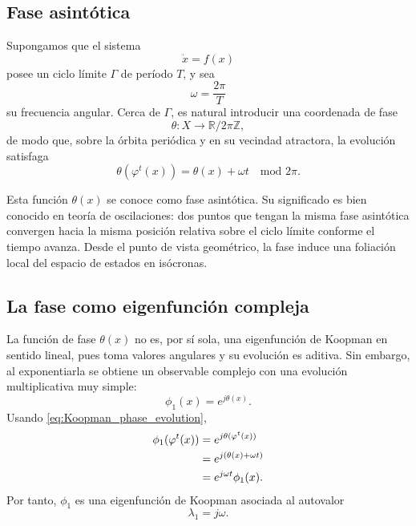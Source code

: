 \subsection{Fase asintótica}

Supongamos que el sistema
\begin{equation}
\dot{x}=f(x)
\label{eq:Koopman_phase_system}
\end{equation}
posee un ciclo límite \(\Gamma\) de período \(T\), y sea
\begin{equation}
\omega=\frac{2\pi}{T}
\label{eq:Koopman_phase_base_frequency}
\end{equation}
su frecuencia angular. Cerca de \(\Gamma\), es natural introducir una coordenada de fase
\begin{equation}
\theta:X\to \mathbb{R}/2\pi\mathbb{Z},
\label{eq:Koopman_phase_function}
\end{equation}
de modo que, sobre la órbita periódica y en su vecindad atractora, la evolución satisfaga
\begin{equation}
\theta(\varphi^t(x))=\theta(x)+\omega t
\quad \text{mod } 2\pi.
\label{eq:Koopman_phase_evolution}
\end{equation}

Esta función \(\theta(x)\) se conoce como fase asintótica. Su significado es bien conocido en teoría de oscilaciones: dos puntos que tengan la misma fase asintótica convergen hacia la misma posición relativa sobre el ciclo límite conforme el tiempo avanza. Desde el punto de vista geométrico, la fase induce una foliación local del espacio de estados en isócronas.

\subsection{La fase como eigenfunción compleja}

La función de fase \(\theta(x)\) no es, por sí sola, una eigenfunción de Koopman en sentido lineal, pues toma valores angulares y su evolución es aditiva. Sin embargo, al exponentiarla se obtiene un observable complejo con una evolución multiplicativa muy simple:
\begin{equation}
\phi_1(x)=e^{j\theta(x)}.
\label{eq:Koopman_phase_observable}
\end{equation}
Usando \eqref{eq:Koopman_phase_evolution},
\begin{align}
\phi_1(\varphi^t(x))
&=
e^{j\theta(\varphi^t(x))} \notag\\
&=
e^{j(\theta(x)+\omega t)} \notag\\
&=
e^{j\omega t}\phi_1(x).
\label{eq:Koopman_phase_eigenfunction}
\end{align}
Por tanto, \(\phi_1\) es una eigenfunción de Koopman asociada al autovalor
\begin{equation}
\lambda_1=j\omega.
\label{eq:Koopman_phase_eigenvalue}
\end{equation}

